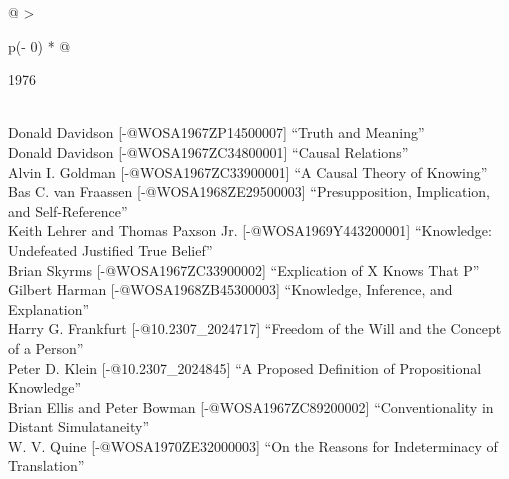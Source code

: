 \documentclass[
  10pt,
  letterpaper,
  DIV=11,
  numbers=noendperiod,
  twoside]{scrartcl}
\begin{document}
\begin{longtable}[]{@{}
  >{\raggedright\arraybackslash}p{(\columnwidth - 0\tabcolsep) * }@{}}

\caption{\label{tbl-top-ten-1967}Most cited articles published less than
ten years ago as of 1976.}

\tabularnewline

\toprule\noalign{}
\begin{minipage}[b]{\linewidth}\raggedright
1976
\end{minipage} \\
\midrule\noalign{}
\endhead
\bottomrule\noalign{}
\endlastfoot
Donald Davidson {[}-@WOSA1967ZP14500007{]} ``Truth and Meaning'' \\
Donald Davidson {[}-@WOSA1967ZC34800001{]} ``Causal Relations'' \\
Alvin I. Goldman {[}-@WOSA1967ZC33900001{]} ``A Causal Theory of
Knowing'' \\
Bas C. van Fraassen {[}-@WOSA1968ZE29500003{]} ``Presupposition,
Implication, and Self-Reference'' \\
Keith Lehrer and Thomas Paxson Jr. {[}-@WOSA1969Y443200001{]}
``Knowledge: Undefeated Justified True Belief'' \\
Brian Skyrms {[}-@WOSA1967ZC33900002{]} ``Explication of X Knows That
P'' \\
Gilbert Harman {[}-@WOSA1968ZB45300003{]} ``Knowledge, Inference, and
Explanation'' \\
Harry G. Frankfurt {[}-@10.2307\_2024717{]} ``Freedom of the Will and
the Concept of a Person'' \\
Peter D. Klein {[}-@10.2307\_2024845{]} ``A Proposed Definition of
Propositional Knowledge'' \\
Brian Ellis and Peter Bowman {[}-@WOSA1967ZC89200002{]}
``Conventionality in Distant Simulataneity'' \\
W. V. Quine {[}-@WOSA1970ZE32000003{]} ``On the Reasons for
Indeterminacy of Translation'' \\

\end{longtable}
\end{document}
